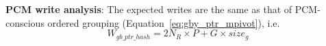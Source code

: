 \textbf{PCM write analysis}: The expected writes are the same as that
of PCM-conscious ordered grouping (Equation~\ref{eq:gby_ptr_mpivot}), i.e. 
\begin{equation}
\label{eq:gby_ptr_hash}
W_{gb\_ptr\_hash} = 2N_R \times P + G \times size_g
\end{equation}



